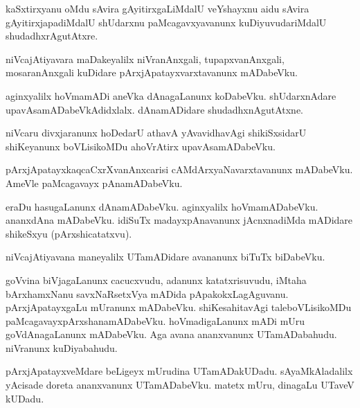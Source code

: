 \begin{mng}
kaSxtirxyanu oMdu sAvira gAyitirxgaLiMdalU veYshayxnu aidu sAvira gAyitirxjapadiMdalU shUdarxnu paMcagavxyavanunx kuDiyuvudariMdalU shudadhxrAgutAtxre.
\end{mng}

\begin{mng}
niVcajAtiyavara maDakeyalilx niVranAnxgali, tupapxvanAnxgali, mosaranAnxgali kuDidare pArxjApatayxvarxtavanunx mADabeVku.
\end{mng}

\begin{mng}
aginxyalilx hoVmamADi aneVka dAnagaLanunx koDabeVku. shUdarxnAdare upavAsamADabeVkAdidxlalx. dAnamADidare shudadhxnAgutAtxne.
\end{mng}

\begin{mng}
niVcaru divxjaranunx hoDedarU athavA yAvavidhavAgi shikiSxsidarU shiKeyanunx boVLisikoMDu ahoVrAtirx upavAsamADabeVku.
\end{mng}

\begin{mng}
pArxjApatayxkaqcaCxrXvanAnxcarisi cAMdArxyaNavarxtavanunx mADabeVku. AmeVle paMcagavayx pAnamADabeVku.
\end{mng}

\begin{mng}
eraDu hasugaLanunx dAnamADabeVku. aginxyalilx hoVmamADabeVku. ananxdAna mADabeVku. idiSuTx madayxpAnavanunx jAcnxnadiMda mADidare shikeSxyu (pArxshicatatxvu).
\end{mng}

\begin{mng}
niVcajAtiyavana maneyalilx UTamADidare avananunx biTuTx biDabeVku.
\end{mng}

\begin{mng}
goVvina biVjagaLanunx cacucxvudu, adanunx katatxrisuvudu, iMtaha bArxhamxNanu savxNaRsetxVya mADida pApakokxLagAguvanu. pArxjApatayxgaLu mUranunx mADabeVku. shiKesahitavAgi taleboVLisikoMDu paMcagavayxpArxshanamADabeVku. hoVmadigaLanunx mADi mUru goVdAnagaLanunx mADabeVku. Aga avana ananxvanunx UTamADabahudu. niVranunx kuDiyabahudu.
\end{mng}

\begin{mng}
pArxjApatayxveMdare beLigeyx mUrudina UTamADakUDadu. sAyaMkAladalilx yAcisade doreta ananxvanunx UTamADabeVku. matetx mUru, dinagaLu UTaveV kUDadu.
\end{mng}

